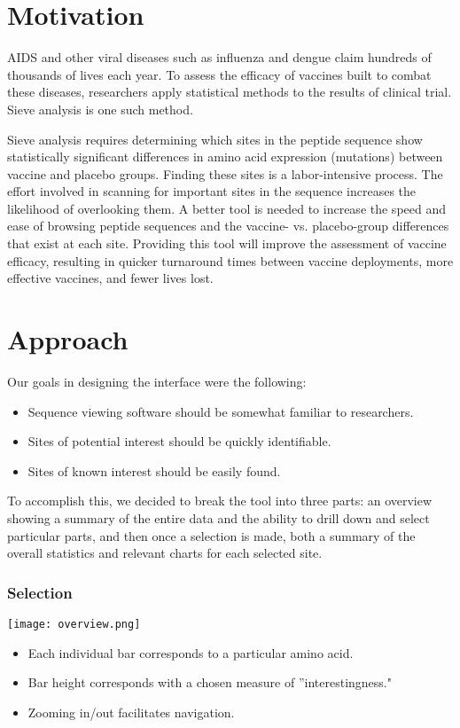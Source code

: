 \documentclass[5pt,clinic]{hmcposter}
\begin{document}
\begin{poster}
\section{Motivation}
AIDS and other viral diseases such as influenza and dengue claim hundreds of thousands of lives each year.
To assess the efficacy of vaccines built to combat these diseases, researchers apply statistical methods to the results of clinical trial. Sieve analysis is one such method.

Sieve analysis requires determining which sites in the peptide sequence show statistically significant differences in amino acid expression (mutations) between vaccine and placebo groups.
Finding these sites is a labor-intensive process.
The effort involved in scanning for important sites in the sequence increases the likelihood of overlooking them.
A better tool is needed to increase the speed and ease of browsing peptide sequences and the vaccine- vs. placebo-group differences that exist at each site.
Providing this tool will improve the assessment of vaccine efficacy, resulting in quicker turnaround times between vaccine deployments, more effective vaccines, and fewer lives lost.



\section{Approach}

Our goals in designing the interface were the following:
\begin{itemize}
\item Sequence viewing software should be somewhat familiar to researchers.
\item Sites of potential interest should be quickly identifiable.
\item Sites of known interest should be easily found.
\end{itemize}

To accomplish this, we decided to break the tool into three parts: an overview showing a summary of the entire data and the ability to drill down and select particular parts, and then once a selection is made, both a summary of the overall statistics and relevant charts for each selected site.

\subsubsection{Selection}
\begin{center}
\texttt{[image: overview.png]}
\end{center}
\begin{itemize}
\item Each individual bar corresponds to a particular amino acid.
\item Bar height corresponds with a chosen measure of ''interestingness."
\item Zooming in/out facilitates navigation.
\end{itemize}


\end{poster}
\end{document}
